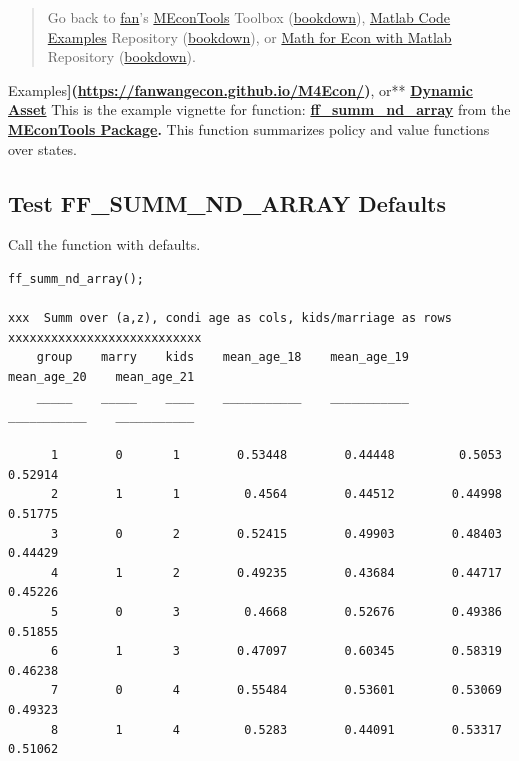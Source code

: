 \documentclass[
]{book}
\begin{document}
\begin{quote}
Go back to \href{http://fanwangecon.github.io/}{fan}'s \href{https://fanwangecon.github.io/MEconTools/}{MEconTools} Toolbox (\href{https://fanwangecon.github.io/MEconTools/bookdown}{bookdown}), \href{https://fanwangecon.github.io/M4Econ/}{Matlab Code Examples} Repository (\href{https://fanwangecon.github.io/M4Econ/bookdown}{bookdown}), or \href{https://fanwangecon.github.io/Math4Econ/}{Math for Econ with Matlab} Repository (\href{https://fanwangecon.github.io/Math4Econ/bookdown}{bookdown}).
\end{quote}

Examples\textbf{{]}(\url{https://fanwangecon.github.io/M4Econ/})}, or** \href{https://fanwangecon.github.io/CodeDynaAsset/}{\textbf{Dynamic
Asset}}
This is the example vignette for function:
\href{https://github.com/FanWangEcon/MEconTools/blob/master/MEconTools/summ/ff_summ_nd_array.m}{\textbf{ff\_summ\_nd\_array}}
from the \href{https://fanwangecon.github.io/MEconTools/}{\textbf{MEconTools
Package}}\textbf{.} This function
summarizes policy and value functions over states.

\hypertarget{test-ff_summ_nd_array-defaults}{%
\subsection{Test FF\_SUMM\_ND\_ARRAY Defaults}\label{test-ff_summ_nd_array-defaults}}

Call the function with defaults.

\begin{verbatim}
ff_summ_nd_array();

xxx  Summ over (a,z), condi age as cols, kids/marriage as rows  xxxxxxxxxxxxxxxxxxxxxxxxxxx
    group    marry    kids    mean_age_18    mean_age_19    mean_age_20    mean_age_21
    _____    _____    ____    ___________    ___________    ___________    ___________

      1        0       1        0.53448        0.44448         0.5053        0.52914  
      2        1       1         0.4564        0.44512        0.44998        0.51775  
      3        0       2        0.52415        0.49903        0.48403        0.44429  
      4        1       2        0.49235        0.43684        0.44717        0.45226  
      5        0       3         0.4668        0.52676        0.49386        0.51855  
      6        1       3        0.47097        0.60345        0.58319        0.46238  
      7        0       4        0.55484        0.53601        0.53069        0.49323  
      8        1       4         0.5283        0.44091        0.53317        0.51062  
\end{verbatim}
\end{document}
